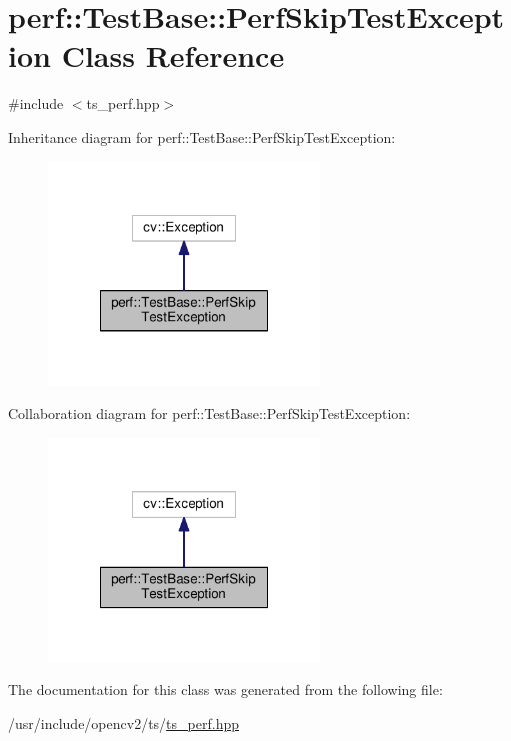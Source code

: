 \hypertarget{classperf_1_1TestBase_1_1PerfSkipTestException}{\section{perf\-:\-:Test\-Base\-:\-:Perf\-Skip\-Test\-Exception Class Reference}
\label{classperf_1_1TestBase_1_1PerfSkipTestException}
}


{\ttfamily \#include $<$ts\-\_\-perf.\-hpp$>$}



Inheritance diagram for perf\-:\-:Test\-Base\-:\-:Perf\-Skip\-Test\-Exception\-:\nopagebreak
\begin{figure}[H]
\begin{center}
\leavevmode
\includegraphics[width=204pt]{classperf_1_1TestBase_1_1PerfSkipTestException__inherit__graph}
\end{center}
\end{figure}


Collaboration diagram for perf\-:\-:Test\-Base\-:\-:Perf\-Skip\-Test\-Exception\-:\nopagebreak
\begin{figure}[H]
\begin{center}
\leavevmode
\includegraphics[width=204pt]{classperf_1_1TestBase_1_1PerfSkipTestException__coll__graph}
\end{center}
\end{figure}


The documentation for this class was generated from the following file\-:\begin{DoxyCompactItemize}
\item 
/usr/include/opencv2/ts/\hyperlink{ts__perf_8hpp}{ts\-\_\-perf.\-hpp}\end{DoxyCompactItemize}
